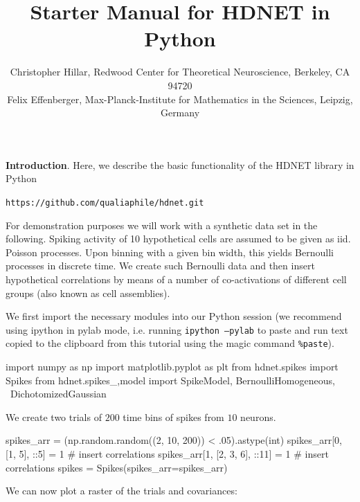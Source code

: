 \documentclass[letter, 12pt]{article}
\theoremstyle{definition}
\theoremstyle{remark}
\begin{document}
\title{Starter Manual for HDNET in Python}
\author{\normalsize Christopher Hillar, Redwood Center for Theoretical Neuroscience, Berkeley, CA 94720\\
\normalsize Felix Effenberger, Max-Planck-Institute for Mathematics in the Sciences, Leipzig, Germany
}
\date{}



\maketitle



\textbf{Introduction}.  Here, we describe the basic functionality of the HDNET library in Python
\begin{center}
\texttt{https://github.com/qualiaphile/hdnet.git} \\
\end{center}

For demonstration purposes we will work with a synthetic data set in the following. Spiking activity of 10 hypothetical cells are assumed to be given as iid. Poisson processes. Upon binning with a given bin width, this yields Bernoulli processes in discrete time. We create such Bernoulli data and then insert hypothetical correlations by means of a number of co-activations of different cell groups (also known as cell assemblies).

We first import the necessary modules into our Python session (we recommend using ipython in pylab mode, i.e. running \texttt{ipython --pylab} to paste and run text copied to the clipboard from this tutorial using the magic command \texttt{\%paste}).

\begin{python}
import numpy as np
import matplotlib.pyplot as plt
from hdnet.spikes import Spikes
from hdnet.spikes_,model import SpikeModel, BernoulliHomogeneous, \ 	
	DichotomizedGaussian
\end{python}

We create two trials of $200$ time bins of spikes from $10$ neurons.

\begin{python}
spikes_arr = (np.random.random((2, 10, 200)) < .05).astype(int)
spikes_arr[0, [1, 5], ::5] = 1 # insert correlations
spikes_arr[1, [2, 3, 6], ::11] = 1  # insert correlations
spikes = Spikes(spikes_arr=spikes_arr)
\end{python}

We can now plot a raster of the trials and covariances:
\end{document}
